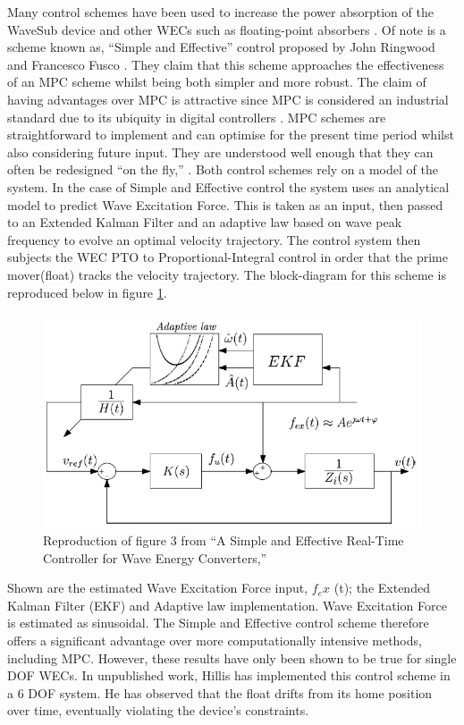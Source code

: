 \documentclass{report}
\begin{document}
Many control schemes have been used to increase the power absorption of the WaveSub device and other WECs such as floating-point absorbers \cite{abdelkhalik2017a}\cite{abdelkhalik2018a}. Of note is a scheme known as, ``Simple and Effective'' control proposed by John Ringwood and Francesco Fusco \cite{ringwood}. They claim that this scheme approaches the effectiveness of an MPC scheme whilst being both simpler and more robust. The claim of having advantages over MPC is attractive since MPC is considered an industrial standard due to its ubiquity in digital controllers \cite{gorinevsky2005a}. MPC schemes are straightforward to implement and can optimise for the present time period whilst also considering future input. They are understood well enough that they can often be redesigned ``on the fly,'' \cite{gorinevsky2005a}. Both control schemes rely on a model of the system. In the case of Simple and Effective control the system uses an analytical model to predict Wave Excitation Force. This is taken as an input, then passed to an Extended Kalman Filter and an adaptive law based on wave peak frequency to evolve an optimal velocity trajectory. The control system then subjects the WEC PTO to Proportional-Integral control in order that the prime mover(float) tracks the velocity trajectory. The block-diagram for this scheme is reproduced below in figure \ref{ringwoodBlockDiagram}. 

\begin{figure}
\centering
\includegraphics[height=0.4\textwidth]{graphics/ringwoodBlockDiagram}
\caption{Reproduction of figure 3 from ``A Simple and Effective Real-Time Controller for Wave Energy Converters,'' \cite{ringwood}}
\label{ringwoodBlockDiagram}
\end{figure}
\FloatBarrier

Shown are the estimated Wave Excitation Force input, $f_ex$ (t); the Extended Kalman Filter (EKF) and Adaptive law implementation. Wave Excitation Force is estimated as sinusoidal. The Simple and Effective control scheme therefore offers a significant advantage over more computationally intensive methods, including MPC. However, these results have only been shown to be true for single DOF WECs. In unpublished work, Hillis has implemented this control scheme in a 6 DOF system\cite{andyMPC}. He has observed that the float drifts from its home position over time, eventually violating the device's constraints. 
\end{document}
